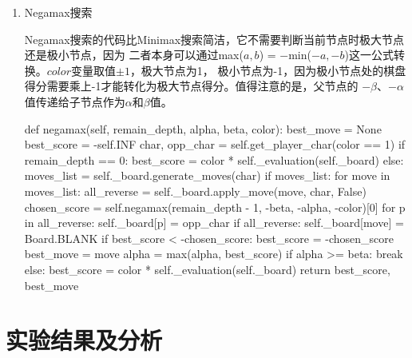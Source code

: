 \documentclass[10pt,letterpaper]{ctexart}
\begin{document}
\begin{enumerate}[itemindent=2.5em,label=\arabic*、]
  \item Negamax搜索
  \par \qquad Negamax搜索的代码比Minimax搜索简洁，它不需要判断当前节点时极大节点还是极小节点，因为
  二者本身可以通过max($a,b$) = $-$min($-a, -b$)这一公式转换。$color$变量取值$\pm 1$，极大节点为1，
  极小节点为-1，因为极小节点处的棋盘得分需要乘上-1才能转化为极大节点得分。值得注意的是，父节点的
  $-\beta$、$-\alpha$值传递给子节点作为$\alpha$和$\beta$值。
\begin{python}
def negamax(self, remain_depth, alpha, beta, color):
  best_move = None
  best_score = -self.INF
  char, opp_char = self.get_player_char(color == 1)
  if remain_depth == 0:
      best_score = color * self._evaluation(self._board)
  else:
      moves_list = self._board.generate_moves(char)
      if moves_list:
          for move in moves_list:
              all_reverse = self._board.apply_move(move, char, False)
              chosen_score = self.negamax(remain_depth - 1, -beta, -alpha, -color)[0]
              for p in all_reverse:
                  self._board[p] = opp_char
              if all_reverse:
                  self._board[move] = Board.BLANK
              if best_score < -chosen_score:
                  best_score = -chosen_score
                  best_move = move
              alpha = max(alpha, best_score)
              if alpha >= beta:
                  break
      else:
          best_score = color * self._evaluation(self._board)
  return best_score, best_move
\end{python}
\end{enumerate}
\section{实验结果及分析}
\end{document}
